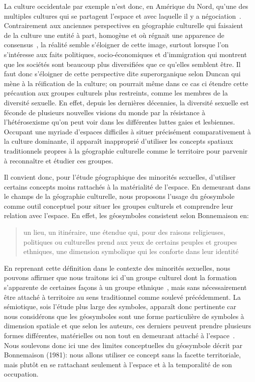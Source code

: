 La culture occidentale par exemple n'est donc, en Amérique du Nord, qu'une des multiples cultures qui se partagent l'espace et avec laquelle il y a négociation~\citep[11]{Duncan1993}. 
Contrairement aux anciennes perspectives en géographie culturelle qui faisaient de la culture une entité à part, homogène et où régnait une apparence de consensus~\citep{Duncan1980}, la réalité semble s'éloigner de cette image, surtout lorsque l'on s'intéresse aux faits politiques, socio-économiques et d'immigration qui montrent que les sociétés sont beaucoup plus diversifiées que ce qu'elles semblent être. 
Il faut donc s'éloigner de cette perspective dite superorganique selon Duncan qui mène à la réification de la culture; on pourrait même dans ce cas ci étendre cette précaution aux groupes culturels plus restreints, comme les membres de la diversité sexuelle. 
En effet, depuis les dernières décennies, la diversité sexuelle est féconde de plusieurs nouvelles visions du monde par la résistance à l'hétérosexisme qu'on peut voir dans les différentes luttes gaies et lesbiennes.
Occupant une myriade d'espaces difficiles à situer précisément comparativement à la culture dominante, il apparaît inapproprié d'utiliser les concepts spatiaux traditionnels propres à la géographie culturelle comme le territoire pour parvenir à reconnaître et étudier ces groupes.

Il convient donc, pour l'étude géographique des minorités sexuelles, d'utiliser certains concepts moins rattachés à la matérialité de l'espace. 
En demeurant dans le champs de la géographie culturelle, nous proposons l'usage du géosymbole comme outil conceptuel pour situer les groupes culturels et comprendre leur relation avec l'espace. 
En effet, les géosymboles consistent selon Bonnemaison en: \blockquote[{\cite[256]{Bonnemaison1981}}][.]{\textelp{} un lieu, un   itinéraire, une étendue qui, pour des raisons religieuses, politiques ou   culturelles prend aux yeux de certains peuples et groupes ethniques, une   dimension symbolique qui les conforte dans leur identité }. 
En reprenant cette définition dans le contexte des minorités sexuelles, nous pouvons affirmer que nous traitons ici d'un groupe culturel dont la formation s'apparente de certaines façons à un groupe ethnique~\citep{Sinfield1996}, mais sans nécessairement être attaché à territoire au sens traditionnel comme soulevé précédemment. 
La sémiotique, sois l'étude plus large des symboles, apparaît donc pertinente car nous considérons que les géosymboles sont une forme particulière de symboles à dimension spatiale et que selon les auteurs, ces derniers peuvent prendre plusieurs formes différentes, matérielles ou non tout en demeurant attaché à l'espace~\citep{Bonnemaison1981,Bedard2002}. 
Nous soulevons donc ici une des limites conceptuelles du géosymbole décrit par Bonnemaison (1981): nous allons utiliser ce concept sans la facette territoriale, mais plutôt en se rattachant seulement à l'espace et à la temporalité de son occupation.

